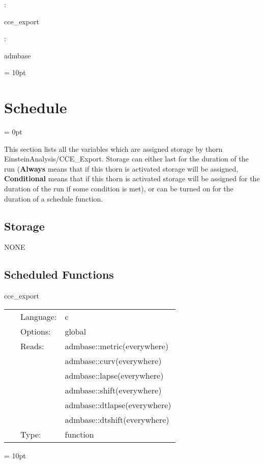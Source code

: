 \documentclass{article}
\begin{document}
: 

cce\_export
\vspace{2mm}

: 

admbase
\vspace{2mm}

\vspace{5mm}\parskip = 10pt 

\section{Schedule} 


\parskip = 0pt


\noindent This section lists all the variables which are assigned storage by thorn EinsteinAnalysis/CCE\_Export.  Storage can either last for the duration of the run ({\bf Always} means that if this thorn is activated storage will be assigned, {\bf Conditional} means that if this thorn is activated storage will be assigned for the duration of the run if some condition is met), or can be turned on for the duration of a schedule function.


\subsection*{Storage}NONE
\subsection*{Scheduled Functions}
\vspace{5mm}


\hspace{5mm} cce\_export 

\hspace{5mm}{\it export metric data on sphere for cce } 


\hspace{5mm}

 \begin{tabular*}{160mm}{cll} 
~ & Language:  & c \\ 
~ & Options:  & global \\ 
~ & Reads:  & admbase::metric(everywhere) \\ 
~& ~ &admbase::curv(everywhere)\\ 
~& ~ &admbase::lapse(everywhere)\\ 
~& ~ &admbase::shift(everywhere)\\ 
~& ~ &admbase::dtlapse(everywhere)\\ 
~& ~ &admbase::dtshift(everywhere)\\ 
~ & Type:  & function \\ 
\end{tabular*} 



\vspace{5mm}\parskip = 10pt 
\end{document}
